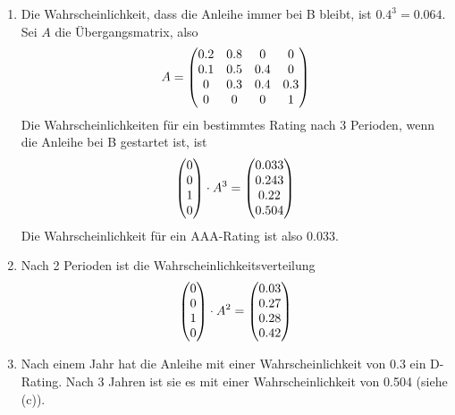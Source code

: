 \documentclass{article}
\begin{document}
\begin{enumerate}[label=(\alph*)]
\begin{center}
		\end{center}
		\item Die Wahrscheinlichkeit, dass die Anleihe immer bei B bleibt, ist $0.4^3=0.064$. Sei $A$ die Übergangsmatrix, also
		\begin{align}
			A = \begin{pmatrix}
				0.2 & 0.8 & 0 & 0 \\
				0.1 & 0.5 & 0.4 & 0 \\
				0 & 0.3 & 0.4 & 0.3 \\
				0 & 0 & 0 & 1
			\end{pmatrix} \notag
		\end{align}
		Die Wahrscheinlichkeiten für ein bestimmtes Rating nach 3 Perioden, wenn die Anleihe bei B gestartet ist, ist
		\begin{align}
			\begin{pmatrix}
				0 \\ 0 \\ 1 \\ 0
			\end{pmatrix} \cdot A^3 = \begin{pmatrix}
				0.033 \\ 0.243 \\ 0.22 \\ 0.504
			\end{pmatrix} \notag
		\end{align}
		Die Wahrscheinlichkeit für ein AAA-Rating ist also 0.033.
		\item Nach 2 Perioden ist die Wahrscheinlichkeitsverteilung
		\begin{align}
			\begin{pmatrix}
				0 \\ 0 \\ 1 \\ 0
			\end{pmatrix} \cdot A^2 = \begin{pmatrix}
				0.03 \\ 0.27 \\ 0.28 \\ 0.42
			\end{pmatrix} \notag
		\end{align}
		\item Nach einem Jahr hat die Anleihe mit einer Wahrscheinlichkeit von 0.3 ein D-Rating. Nach 3 Jahren ist sie es mit einer Wahrscheinlichkeit von 0.504 (siehe (c)).

\end{enumerate}
\end{document}
